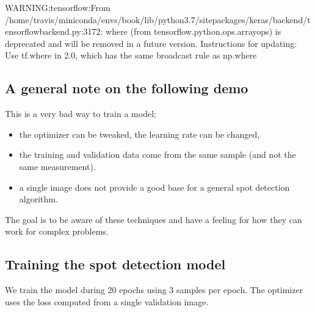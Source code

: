 \documentclass[letterpaper,10pt,english]{sphinxmanual}
\begin{document}
\begin{sphinxVerbatim}[commandchars=\\\{\}]
WARNING:tensorflow:From /home/travis/miniconda/envs/book/lib/python3.7/site\PYGZhy{}packages/keras/backend/tensorflow\PYGZus{}backend.py:3172: where (from tensorflow.python.ops.array\PYGZus{}ops) is deprecated and will be removed in a future version.
Instructions for updating:
Use tf.where in 2.0, which has the same broadcast rule as np.where
\end{sphinxVerbatim}


\subsection{A general note on the following demo}
\label{\detokenize{ML4NeutronImageSegmentation:a-general-note-on-the-following-demo}}
This is a very bad way to train a model;
\begin{itemize}
\item {} 
the optimizer can be tweaked,  the learning rate can be changed,

\item {} 
the training and validation data  come from the same sample (and  not the same measurement).

\item {} 
a single image does not provide a good base for a general spot detection algorithm.

\end{itemize}

The goal is to be aware of these techniques and have a feeling for how they can work for complex problems.


\subsection{Training the spot detection model}
\label{\detokenize{ML4NeutronImageSegmentation:training-the-spot-detection-model}}
We train the model during 20 epochs using 3 samples per epoch. The optimizer uses the loss computed from a single validation image.
\end{document}

